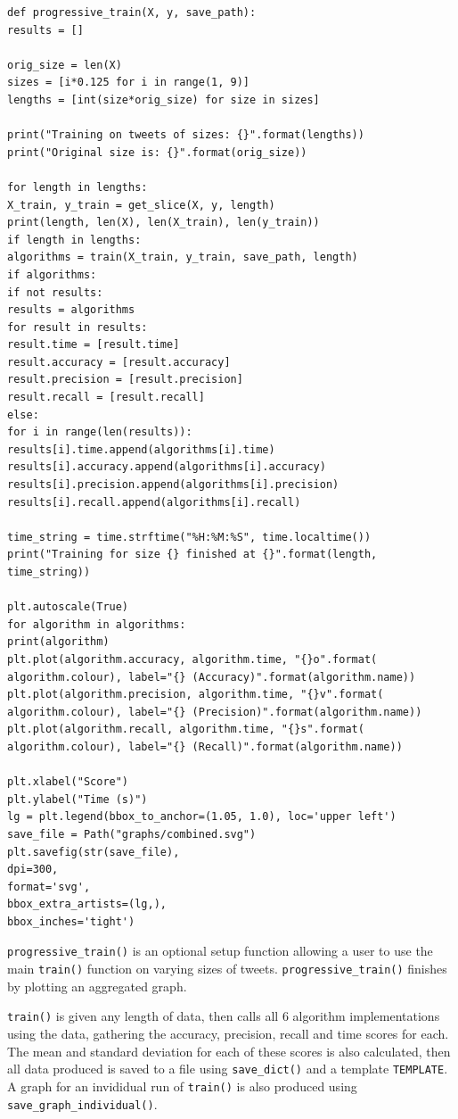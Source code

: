 \documentclass{article}
\begin{document}
\begin{lstlisting}
def progressive_train(X, y, save_path):
results = []

orig_size = len(X)
sizes = [i*0.125 for i in range(1, 9)]
lengths = [int(size*orig_size) for size in sizes]

print("Training on tweets of sizes: {}".format(lengths))
print("Original size is: {}".format(orig_size))

for length in lengths:
X_train, y_train = get_slice(X, y, length)
print(length, len(X), len(X_train), len(y_train))
if length in lengths:
algorithms = train(X_train, y_train, save_path, length)
if algorithms:
if not results:
results = algorithms
for result in results:
result.time = [result.time]
result.accuracy = [result.accuracy]
result.precision = [result.precision]
result.recall = [result.recall]
else:
for i in range(len(results)):
results[i].time.append(algorithms[i].time)
results[i].accuracy.append(algorithms[i].accuracy)
results[i].precision.append(algorithms[i].precision)
results[i].recall.append(algorithms[i].recall)

time_string = time.strftime("%H:%M:%S", time.localtime())
print("Training for size {} finished at {}".format(length, time_string))

plt.autoscale(True)
for algorithm in algorithms:
print(algorithm)
plt.plot(algorithm.accuracy, algorithm.time, "{}o".format(
algorithm.colour), label="{} (Accuracy)".format(algorithm.name))
plt.plot(algorithm.precision, algorithm.time, "{}v".format(
algorithm.colour), label="{} (Precision)".format(algorithm.name))
plt.plot(algorithm.recall, algorithm.time, "{}s".format(
algorithm.colour), label="{} (Recall)".format(algorithm.name))

plt.xlabel("Score")
plt.ylabel("Time (s)")
lg = plt.legend(bbox_to_anchor=(1.05, 1.0), loc='upper left')
save_file = Path("graphs/combined.svg")
plt.savefig(str(save_file),
dpi=300,
format='svg',
bbox_extra_artists=(lg,),
bbox_inches='tight')
\end{lstlisting}

\lstinline{progressive_train()} is an optional setup function allowing a user to use the main \lstinline{train()} function on varying sizes of tweets.
\lstinline{progressive_train()} finishes by plotting an aggregated graph.

\lstinline{train()} is given any length of data, then calls all 6 algorithm implementations using the data, gathering the accuracy, precision, recall and time scores for each.
The mean and standard deviation for each of these scores is also calculated, then all data produced is saved to a file using \lstinline{save_dict()} and a template \lstinline{TEMPLATE}.
A graph for an invididual run of \lstinline{train()} is also produced using \lstinline{save_graph_individual()}.
\end{document}
